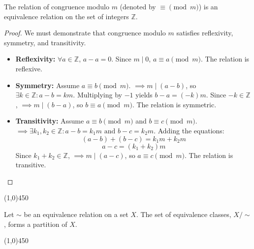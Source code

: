 \begin{theorem}
The relation of congruence modulo $m$ (denoted by $\equiv \pmod{m}$) is an equivalence relation on the set of integers $\mathbb{Z}$.
\end{theorem}
\begin{proof}
We must demonstrate that congruence modulo $m$ satisfies reflexivity, symmetry, and transitivity.
\begin{itemize}
    \item \textbf{Reflexivity:} $\forall a \in \mathbb{Z}$, $a - a = 0$. Since $m \mid 0$, $a \equiv a \pmod{m}$. The relation is reflexive.
    \item \textbf{Symmetry:} Assume $a \equiv b \pmod{m}$. $\implies m \mid (a - b)$, so $\exists k \in \mathbb{Z} : a - b = k m$.
    Multiplying by $-1$ yields $b - a = (-k) m$. Since $-k \in \mathbb{Z}$, $\implies m \mid (b - a)$, so $b \equiv a \pmod{m}$. The relation is symmetric.
    \item \textbf{Transitivity:} Assume $a \equiv b \pmod{m}$ and $b \equiv c \pmod{m}$.
    $\implies \exists k_1, k_2 \in \mathbb{Z} : a - b = k_1 m \text{ and } b - c = k_2 m$.
    Adding the equations:
    $$ (a - b) + (b - c) = k_1 m + k_2 m $$
    $$ a - c = (k_1 + k_2) m $$
    Since $k_1 + k_2 \in \mathbb{Z}$, $\implies m \mid (a - c)$, so $a \equiv c \pmod{m}$. The relation is transitive. \qedhere
\end{itemize}
\end{proof}

\begin{center}
    \vspace{10pt}
    \line(1,0){450}
    \vspace{25pt}
\end{center}

\begin{proposition}
Let $\sim$ be an equivalence relation on a set $X$. The set of equivalence classes, $X/\sim$, forms a partition of $X$.
\end{proposition}

\begin{center}
    \vspace{10pt}
    \line(1,0){450}
    \vspace{25pt}
\end{center}